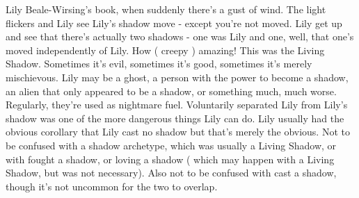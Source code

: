 \documentclass[12pt]{book}
\begin{document}
Lily Beale-Wirsing's book, when suddenly there's a gust of wind. The light flickers and Lily see Lily's shadow move - except you're not moved. Lily get up and see that there's actually two shadows - one was Lily and one, well, that one's moved independently of Lily. How ( creepy ) amazing! This was the Living Shadow. Sometimes it's evil, sometimes it's good, sometimes it's merely mischievous. Lily may be a ghost, a person with the power to become a shadow, an alien that only appeared to be a shadow, or something much, much worse. Regularly, they're used as nightmare fuel. Voluntarily separated Lily from Lily's shadow was one of the more dangerous things Lily can do. Lily usually had the obvious corollary that Lily cast no shadow but that's merely the obvious. Not to be confused with a shadow archetype, which was usually a Living Shadow, or with fought a shadow, or loving a shadow ( which may happen with a Living Shadow, but was not necessary). Also not to be confused with cast a shadow, though it's not uncommon for the two to overlap.
\end{document}
